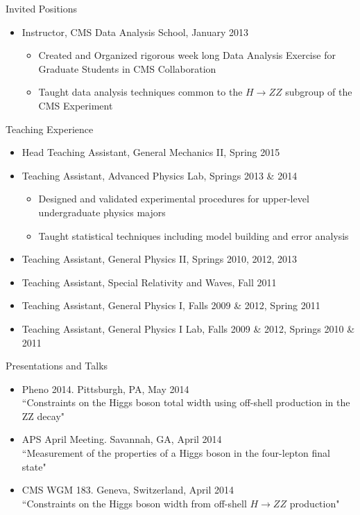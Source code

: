 \begin{small}
\begin{cvlist}{Invited Positions}
\item
\begin{itemize}\itemsep=0.25em
	\item Instructor, CMS Data Analysis School, January 2013
	\begin{itemize}
		\item Created and Organized rigorous week long Data Analysis Exercise for Graduate Students in CMS Collaboration
		\item Taught data analysis techniques common to the $H\rightarrow ZZ$ subgroup of the CMS Experiment
	\end{itemize}
\end{itemize}
\end{cvlist}

\begin{cvlist}{Teaching Experience}
\item
\begin{itemize}\itemsep=0.25em
	\item Head Teaching Assistant, General Mechanics II, Spring 2015
	\item Teaching Assistant, Advanced Physics Lab, Springs 2013 \& 2014
	\begin{itemize}
		\item Designed and validated experimental procedures for upper-level undergraduate physics majors
		\item Taught statistical techniques including model building and error analysis
	\end{itemize}
	\item Teaching Assistant, General Physics II, Springs 2010, 2012, 2013
	\item Teaching Assistant, Special Relativity and Waves, Fall 2011
	\item Teaching Assistant, General Physics I, Falls 2009 \& 2012, Spring 2011
	\item Teaching Assistant, General Physics I Lab, Falls 2009 \& 2012, Springs 2010 \& 2011
\end{itemize}
\end{cvlist}

\begin{cvlist}{Presentations and Talks}
\item
\begin{itemize}\itemsep=0.25em
	\item Pheno 2014. Pittsburgh, PA, May 2014 \\
	``Constraints on the Higgs boson total width using off-shell production in the ZZ decay"
	\item APS April Meeting. Savannah, GA, April 2014 \\
	``Measurement of the properties of a Higgs boson in the four-lepton final state"
	\item CMS WGM 183. Geneva, Switzerland, April 2014 \\
	``Constraints on the Higgs boson width from off-shell $H\rightarrow ZZ$ production"
\end{itemize}
\end{cvlist}


\end{small}

